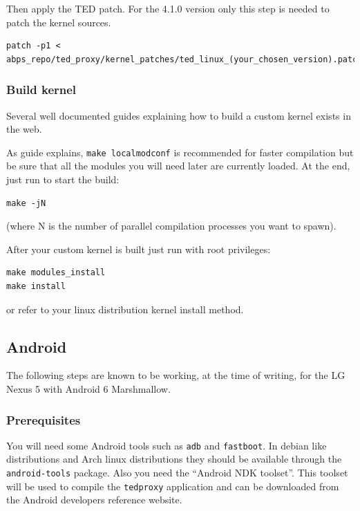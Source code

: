 \documentclass[a4paper]{article}
\begin{document}
Then apply the TED patch. For the 4.1.0 version only this step is needed to patch the kernel sources.
\begin{lstlisting}	
patch -p1 < abps_repo/ted_proxy/kernel_patches/ted_linux_(your_chosen_version).patch
\end{lstlisting}

\subsubsection{Build kernel}
Several well documented guides explaining how to build a custom kernel
exists in the web\cite{kernelcompilation}\cite{kernelcompilation2}.

As guide \cite{kernelcompilation} explains, \texttt{make
localmodconf} 
is recommended for faster compilation but be sure that all the modules you will need later 
are currently loaded.  
At the end, just run to start the build:

\begin{lstlisting}	
make -jN
\end{lstlisting}

(where N is the number of parallel compilation processes you want to spawn).

After your custom kernel is built just run with root privileges:
\begin{lstlisting}
make modules_install
make install
\end{lstlisting}

or refer to your linux distribution kernel install method.

\subsection{Android}
The following steps are known to be working, at the time of writing, 
for the LG Nexus 5 with Android 6 Marshmallow.

\subsubsection{Prerequisites} 
You will need some Android tools such as \texttt{adb} and \texttt{fastboot}. In debian like
distributions and Arch linux distributions they should be available
through the \texttt{android-tools}
package. Also you need the ``Android NDK toolset''. This toolset will be used to
compile the \texttt{tedproxy} application and can be downloaded from the Android
developers reference website\cite{androiddev}.
\end{document}

